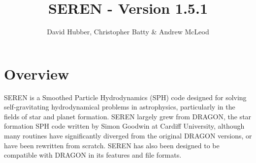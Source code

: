 \documentclass[a4paper]{article}
\begin{document}
\title{SEREN - Version 1.5.1}
\author{David Hubber, Christopher Batty \& Andrew McLeod}

\maketitle

\tableofcontents

\newpage

\section{Overview}
SEREN is a Smoothed Particle Hydrodynamics (SPH) code designed for solving self-gravitating hydrodynamical problems in astrophysics, particularly in the fields of star and planet formation.  SEREN largely grew from DRAGON, the star formation SPH code written by Simon Goodwin at Cardiff University, although many routines have significantly diverged from the original DRAGON versions, or have been rewritten from scratch.  SEREN has also been designed to be compatible with DRAGON in its features and file formats. \newline
\end{document}
